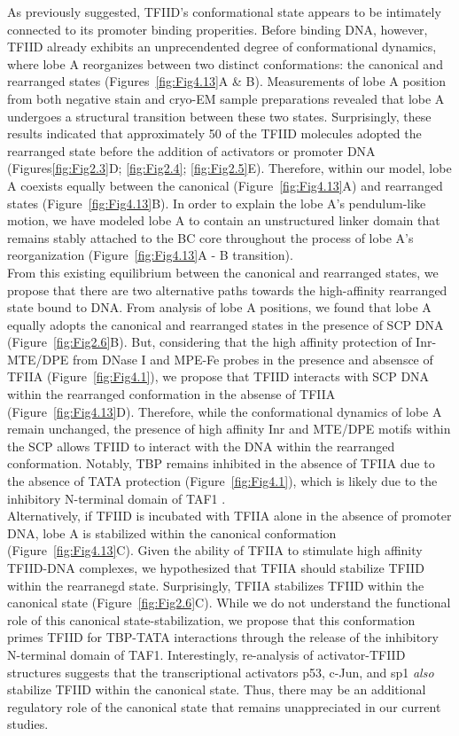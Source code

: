 As previously suggested, TFIID's conformational state appears to be intimately connected to its promoter binding properities. Before binding DNA, however, TFIID already exhibits an unprecendented degree of conformational dynamics, where lobe A reorganizes between two distinct conformations: the canonical and rearranged states (Figures~\ref{fig:Fig4.13}A \& B). Measurements of lobe A position from both negative stain and cryo-EM sample preparations revealed that lobe A undergoes a structural transition between these two states. Surprisingly, these results indicated that approximately 50 of the TFIID molecules adopted the rearranged state before the addition of activators or promoter DNA  (Figures\ref{fig:Fig2.3}D; \ref{fig:Fig2.4}; \ref{fig:Fig2.5}E). Therefore, within our model, lobe A coexists equally between the canonical (Figure~\ref{fig:Fig4.13}A) and rearranged states (Figure~\ref{fig:Fig4.13}B). In order to explain the lobe A's pendulum-like motion, we have modeled lobe A to contain an unstructured linker domain that remains stably attached to the BC core throughout the process of lobe A's reorganization (Figure~\ref{fig:Fig4.13}A - B transition). \\
\indent From this existing equilibrium between the canonical and rearranged states, we propose that there are two alternative paths towards the high-affinity rearranged state bound to DNA. From analysis of lobe A positions, we found that lobe A equally adopts the canonical and rearranged states in the presence of SCP DNA (Figure~\ref{fig:Fig2.6}B). But, considering that the high affinity protection of Inr-MTE/DPE from DNase I and MPE-Fe probes in the presence and absensce of TFIIA (Figure~\ref{fig:Fig4.1}), we propose that TFIID interacts with SCP DNA within the rearranged conformation in the absense of TFIIA (Figure~\ref{fig:Fig4.13}D). Therefore, while the conformational dynamics of lobe A remain unchanged, the presence of high affinity Inr and MTE/DPE motifs within the SCP allows TFIID to interact with the DNA within the rearranged conformation.  Notably, TBP remains inhibited in the absence of TFIIA due to the absence of TATA protection (Figure~\ref{fig:Fig4.1}), which is likely due to the inhibitory N-terminal domain of TAF1 \cite{Bagby_2202,Geiger_2949,Liu_2574}. \\
\indent Alternatively, if TFIID is incubated with TFIIA alone in the absence of promoter DNA, lobe A is stabilized within the canonical conformation (Figure~\ref{fig:Fig4.13}C). Given the ability of TFIIA to stimulate high affinity TFIID-DNA complexes, we hypothesized that TFIIA should stabilize TFIID within the rearranegd state. Surprisingly, TFIIA stabilizes TFIID within the canonical state (Figure~\ref{fig:Fig2.6}C). While we do not understand the functional role of this canonical state-stabilization, we propose that this conformation primes TFIID for TBP-TATA interactions through the release of the inhibitory N-terminal domain of TAF1. Interestingly, re-analysis of activator-TFIID structures suggests that the transcriptional activators p53, c-Jun, and sp1 \emph{also} stabilize TFIID within the canonical state. Thus, there may be an additional regulatory role of the canonical state that remains unappreciated in our current studies.\\
